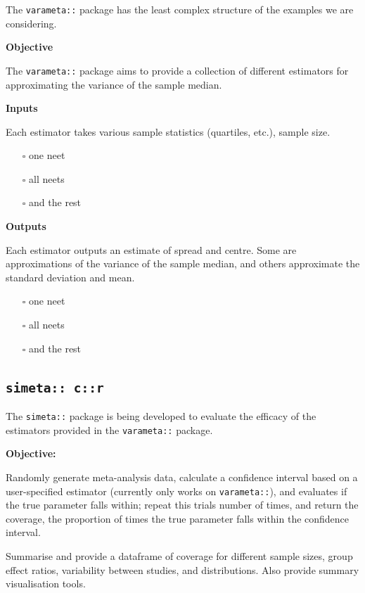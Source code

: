 \documentclass[
]{article}
\providecommand{\tightlist}{%
  \setlength{\itemsep}{0pt}\setlength{\parskip}{0pt}}
\begin{document}
The \texttt{varameta::} package has the least complex structure of the examples we are considering.

\textbf{Objective}

The \texttt{varameta::} package aims to provide a collection of different estimators for approximating the variance of the sample median.

\textbf{Inputs}

Each estimator takes various sample statistics (quartiles, etc.), sample size.

\begin{itemize}
\tightlist
\item[$\square$]
  one neet
\item[$\square$]
  all neets
\item[$\square$]
  and the rest
\end{itemize}

\textbf{Outputs}

Each estimator outputs an estimate of spread and centre. Some are approximations of the variance of the sample median, and others approximate the standard deviation and mean.

\begin{itemize}
\tightlist
\item[$\square$]
  one neet
\item[$\square$]
  all neets
\item[$\square$]
  and the rest
\end{itemize}

\hypertarget{simeta-cr}{%
\subsection{\texorpdfstring{\texttt{simeta::\ c::r}}{simeta:: c::r}}\label{simeta-cr}}

The \texttt{simeta::} package is being developed to evaluate the efficacy of the estimators provided in the \texttt{varameta::} package.

\textbf{Objective:}

Randomly generate meta-analysis data, calculate a confidence interval based on a user-specified estimator (currently only works on \texttt{varameta::}), and evaluates if the true parameter falls within; repeat this \textbar trials\textbar{} number of times, and return the coverage, the proportion of times the true parameter falls within the confidence interval.

Summarise and provide a dataframe of coverage for different sample sizes, group effect ratios, variability between studies, and distributions. Also provide summary visualisation tools.
\end{document}
